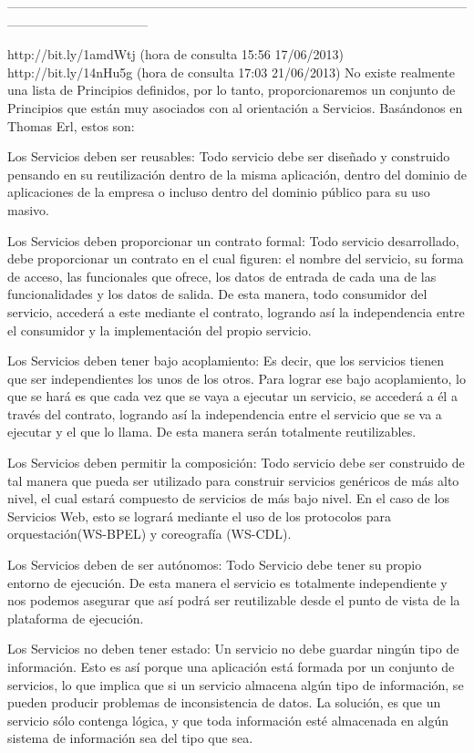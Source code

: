 ---------------------------------------------------------------------------------------------------------------------------------------------

http://bit.ly/1amdWtj (hora de consulta 15:56 17/06/2013)
http://bit.ly/14nHu5g (hora de consulta 17:03 21/06/2013)
No existe realmente una lista de Principios definidos, por lo tanto, proporcionaremos un conjunto de Principios que están muy asociados con al orientación a Servicios.
Basándonos en Thomas Erl, estos son:



    Los Servicios deben ser reusables: Todo servicio debe ser diseñado y construido pensando en su reutilización dentro de la misma 
    aplicación, dentro del dominio de aplicaciones de la empresa o incluso dentro del dominio público para su uso masivo.

    Los Servicios deben proporcionar un contrato formal: Todo servicio desarrollado, debe proporcionar un contrato en el cual figuren: 
    el nombre del servicio, su forma de acceso, las funcionales que ofrece, los datos de entrada de cada una de las funcionalidades y 
    los datos de salida. De esta manera, todo consumidor del servicio, accederá a este mediante el contrato, logrando así la independencia 
    entre el consumidor y la implementación del propio servicio.

    Los Servicios deben tener bajo acoplamiento: Es decir, que los servicios tienen que ser independientes los unos de los otros. Para 
    lograr ese bajo acoplamiento, lo que se hará es que cada vez que se vaya a ejecutar un servicio, se accederá a él a través del contrato, 
    logrando así la independencia entre el servicio que se va a ejecutar y el que lo llama. De esta manera serán totalmente reutilizables.

    Los Servicios deben permitir la composición: Todo servicio debe ser construido de tal manera que pueda ser utilizado para construir 
    servicios genéricos de más alto nivel, el cual estará compuesto de servicios de más bajo nivel. En el caso de los Servicios Web, esto 
    se logrará mediante el uso de los protocolos para orquestación(WS-BPEL) y coreografía (WS-CDL).

    Los Servicios deben de ser autónomos: Todo Servicio debe tener su propio entorno de ejecución. De esta manera el servicio es totalmente 
    independiente y nos podemos asegurar que así podrá ser reutilizable desde el punto de vista de la plataforma de ejecución.

    Los Servicios no deben tener estado: Un servicio no debe guardar ningún tipo de información. Esto es así porque una aplicación está 
    formada por un conjunto de servicios, lo que implica que si un servicio almacena algún tipo de información, se pueden producir 
    problemas de inconsistencia de datos. La solución, es que un servicio sólo contenga lógica, y que toda información esté almacenada 
    en algún sistema de información sea del tipo que sea.

